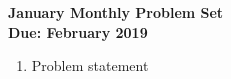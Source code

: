 \documentclass{article}
\begin{document}
\begin{center}
\textbf{\Large January Monthly Problem Set}
\\ \vspace{1em}
\textbf{\large Due: February 2019}
\end{center}

\begin{enumerate}[1.]

\item %
Problem statement

\end{enumerate}
\end{document}
